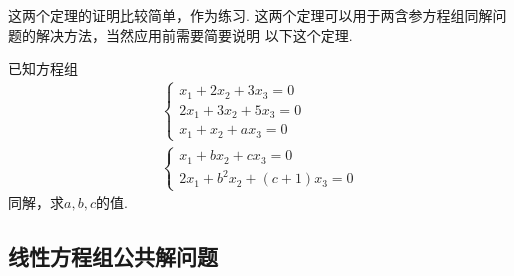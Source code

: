 这两个定理的证明比较简单，作为练习. 这两个定理可以用于两含参方程组同解问题的解决方法，当然应用前需要简要说明
以下这个定理.
\begin{example}
    已知方程组\begin{gather*}\begin{cases}
            x_1+2x_2+3x_3=0 \\ 2x_1+3x_2+5x_3=0 \\ x_1+x_2+ax_3=0
        \end{cases}
        \\
        \begin{cases}
            x_1+bx_2+cx_3=0 \\ 2x_1+b^2x_2+(c+1)x_3=0
        \end{cases}
    \end{gather*}
    同解，求$a,b,c$的值.
\end{example}

\subsection{线性方程组公共解问题}

